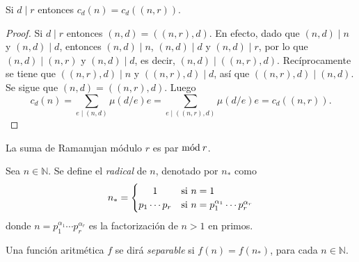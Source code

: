 \begin{lemma}
Si $d \mid r$ entonces $c_d(n)=c_d((n,r))$.
\end{lemma}
\begin{proof}
Si $d \mid r$ entonces $(n,d)=((n,r),d)$. En efecto, dado que $(n,d) \mid n$ y $(n,d) \mid d$, entonces $(n,d) \mid n$, $(n,d) \mid d$ y $(n,d) \mid r$, por lo que $(n,d) \mid (n,r)$ y $(n,d) \mid d$, es decir, $(n,d) \mid ((n,r),d)$. Recíprocamente se tiene que $((n,r),d) \mid n$ y $((n,r),d) \mid d$, así que $((n,r),d) \mid (n,d)$. Se sigue que $(n,d)=((n,r),d)$. Luego
\begin{equation*}
    c_d(n) = \sum_{e \mid (n,d)} \mu(d/e) e = \sum_{e \mid ((n,r),d)} \mu(d/e) e = c_d((n,r)).
\end{equation*}
\end{proof}

\begin{corollary}
La suma de Ramanujan módulo $r$ es par $\mathrm{m\acute{o}d\:}r$.
\end{corollary}

\begin{definition}[Radical]
Sea $n \in \mathbb{N}$. Se define el \emph{radical} de $n$, denotado por $n_*$ como
\begin{equation*}
    n_* = \begin{cases}
        \hfil 1 & \text{si } n=1 \\
        \hfil p_1 \cdots p_r & \text{si } n = p_1^{\alpha_1} \cdots p_r^{\alpha_r}
    \end{cases}
\end{equation*}
donde $n=p_1^{\alpha_1} \cdots p_r^{\alpha_r}$ es la factorización de $n>1$ en primos.
\end{definition}

\begin{definition}
Una función aritmética $f$ se dirá \emph{separable} si $f(n)=f(n_*)$, para cada $n \in \mathbb{N}$.
\end{definition}

